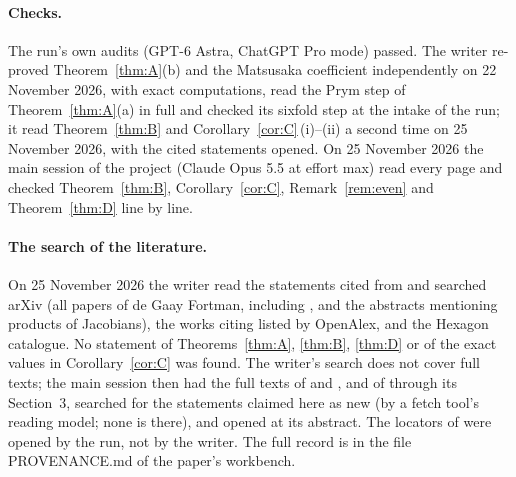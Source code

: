 \documentclass[11pt,a4paper]{article}
\theoremstyle{definition}
\begin{document}
\paragraph{Checks.} The run's own audits (GPT-6 Astra, ChatGPT Pro
mode) passed. The writer re-proved Theorem~\ref{thm:A}(b) and the Matsusaka
coefficient independently on 22 November 2026, with exact computations, read
the Prym step of Theorem~\ref{thm:A}(a) in full and checked its sixfold step
at the intake of the run;
it read Theorem~\ref{thm:B} and Corollary~\ref{cor:C}\,(i)--(ii) a second
time on 25 November 2026, with the cited statements opened. On 25 November
2026 the main session of the project (Claude Opus 5.5 at effort max) read every
page and checked Theorem~\ref{thm:B}, Corollary~\ref{cor:C},
Remark~\ref{rem:even} and Theorem~\ref{thm:D} line by line.

\paragraph{The search of the literature.} On 25 November 2026 the writer
read the statements cited from \cite{BdGF,EGFS,EGFS2,ES,SS} and searched
arXiv (all papers of de Gaay Fortman, including \cite{GFS}, and the
abstracts mentioning products of Jacobians), the works citing
\cite{BdGF,EGFS,EGFS2,SS} listed by OpenAlex, and the Hexagon catalogue. No
statement of Theorems~\ref{thm:A}, \ref{thm:B}, \ref{thm:D} or of the exact
values in Corollary~\ref{cor:C} was found. The writer's search does not cover
full texts; the main session then had the full texts of \cite{SS} and
\cite{EGFS2}, and of \cite{EGFS} through its Section~3, searched for the
statements claimed here as new (by a fetch tool's reading model; none is
there), and opened \cite{ES} at its abstract. The locators of \cite{ADFIO,Be,Fu,Mi,Mu,OU,Oo,Vo} were opened by the
run, not by the writer. The full record is in the file PROVENANCE.md of the
paper's workbench.
\end{document}
